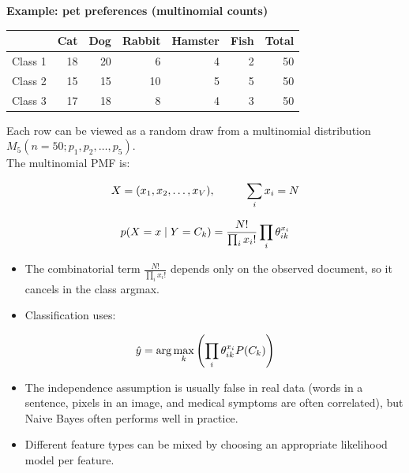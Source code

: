 \documentclass[10pt,a4paper]{article}
\begin{document}
		\textbf{Example: pet preferences (multinomial counts)}
	
		\begin{center}
			\begin{tabular}{lrrrrrr}
				\toprule
				& Cat & Dog & Rabbit & Hamster & Fish & Total \\
				\midrule
				Class 1 & 18 & 20 & 6 & 4 & 2 & 50 \\
				Class 2 & 15 & 15 & 10 & 5 & 5 & 50 \\
				Class 3 & 17 & 18 & 8 & 4 & 3 & 50 \\
				\bottomrule
			\end{tabular}
		\end{center}
	
		Each row can be viewed as a random draw from a multinomial distribution $M_5(n=50; p_1, p_2, \dots, p_5)$. \\
		The multinomial PMF is:
	
		\begin{align*}
			\Large X=(x_1,x_2,\dots,x_V), \qquad \sum_i x_i = N
		\end{align*}
	
		\begin{align*}
			\Large p(X=x\mid Y=C_k) = \frac{N!}{\prod_i x_i!} \prod_i \theta_{ik}^{x_i}
		\end{align*}
	
		\begin{itemize}
			\item The combinatorial term $\frac{N!}{\prod_i x_i!}$ depends only on the observed document, so it cancels in the class argmax.
			\item Classification uses:
		\end{itemize}
	
		\begin{align*}
			\Large \hat{y} = \arg\max_k \left( \prod_i \theta_{ik}^{x_i} P(C_k) \right)
		\end{align*}
	

		\begin{itemize}
			\item The independence assumption is usually false in real data (words in a sentence, pixels in an image, and medical symptoms are often correlated), but Naive Bayes often performs well in practice.
			\item Different feature types can be mixed by choosing an appropriate likelihood model per feature.
		\end{itemize}

		\newpage
\end{document}
